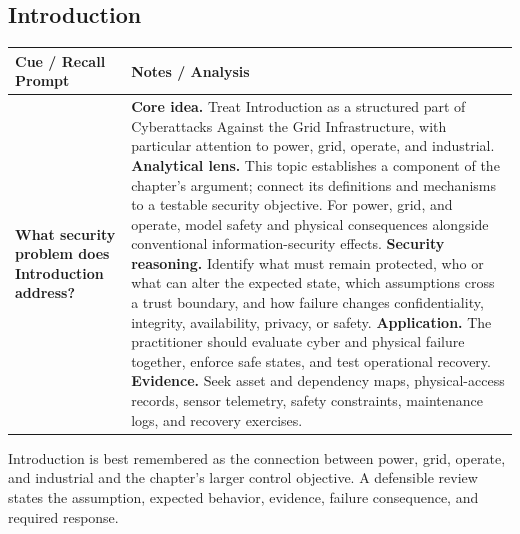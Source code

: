 \documentclass[11pt]{article}
\newcommand{\CornellHeader}{%
\rowcolor{Navy}\color{white}\bfseries Cue / Recall Prompt & \color{white}\bfseries Notes / Analysis\\\hline}
\newcommand{\CornellRow}[2]{%
\cellcolor{CueGray}\RaggedRight\textbf{#1} & \RaggedRight #2\\\hline}
\begin{document}
\subsection*{Introduction}
\begin{longtable}{>{\RaggedRight\arraybackslash}p{}|>{\RaggedRight\arraybackslash}p{}}
\CornellHeader
\CornellRow{What security problem does Introduction address?}{\textbf{Core idea.} Treat Introduction as a structured part of Cyberattacks Against the Grid Infrastructure, with particular attention to power, grid, operate, and industrial. \textbf{Analytical lens.} This topic establishes a component of the chapter's argument; connect its definitions and mechanisms to a testable security objective. For power, grid, and operate, model safety and physical consequences alongside conventional information-security effects. \textbf{Security reasoning.} Identify what must remain protected, who or what can alter the expected state, which assumptions cross a trust boundary, and how failure changes confidentiality, integrity, availability, privacy, or safety. \textbf{Application.} The practitioner should evaluate cyber and physical failure together, enforce safe states, and test operational recovery. \textbf{Evidence.} Seek asset and dependency maps, physical-access records, sensor telemetry, safety constraints, maintenance logs, and recovery exercises.}
\end{longtable}
\begin{topicsummary}
Introduction is best remembered as the connection between power, grid, operate, and industrial and the chapter's larger control objective. A defensible review states the assumption, expected behavior, evidence, failure consequence, and required response.
\end{topicsummary}
\end{document}
